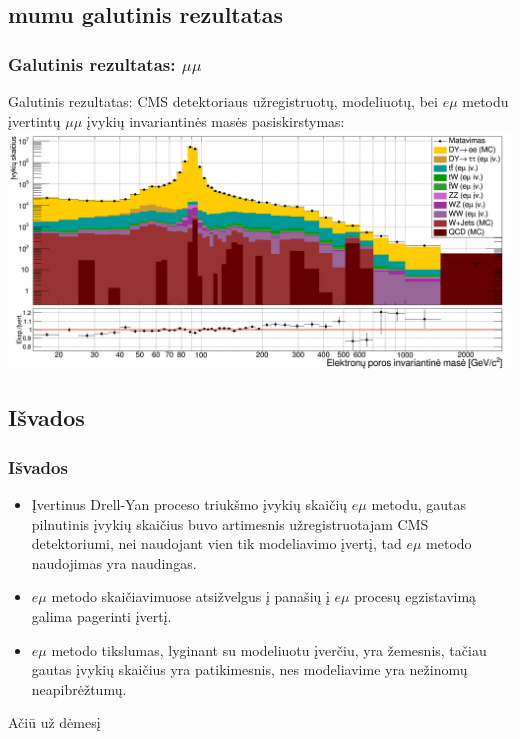 \documentclass[xcolor=dvipsnames]{beamer}
\newcommand{\emu}{\mathit{e}\mu}
\newcommand{\mumu}{\mu\mu}
\begin{document}
\begin{frame}
	\section{mumu galutinis rezultatas}
	\frametitle{Galutinis rezultatas: $\mumu$}
	Galutinis rezultatas: CMS detektoriaus užregistruotų, modeliuotų, bei $\emu$ metodu įvertintų $\mumu$ įvykių invariantinės
	masės pasiskirstymas:
	\includegraphics[width=\textwidth]{eeMassFinal_BIG.png}
\end{frame}


\begin{frame}
\section{Išvados}
\frametitle{Išvados}
\begin{itemize}
\item Įvertinus Drell-Yan proceso triukšmo įvykių skaičių $\emu$ metodu, gautas pilnutinis įvykių skaičius buvo artimesnis užregistruotajam CMS detektoriumi, nei naudojant vien tik modeliavimo įvertį, tad $\emu$ metodo naudojimas yra naudingas.
\item $\emu$ metodo skaičiavimuose atsižvelgus į panašių į $\emu$ procesų egzistavimą galima pagerinti įvertį.
\item $\emu$ metodo tikslumas, lyginant su modeliuotu įverčiu, yra žemesnis, tačiau gautas įvykių skaičius yra patikimesnis, nes modeliavime yra nežinomų neapibrėžtumų.
\end{itemize}
\end{frame}

\begin{frame}
\begin{center}
\huge Ačiū už dėmesį
\end{center}
\end{frame}

\appendix
\end{document}
